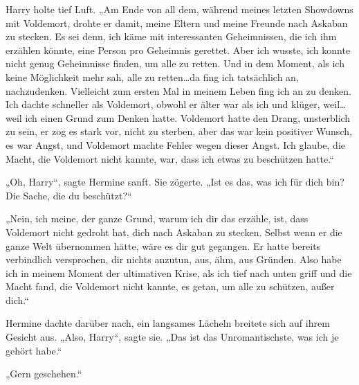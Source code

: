 Harry holte tief Luft.
„Am Ende von all dem, während meines letzten Showdowns mit Voldemort, drohte er damit, meine Eltern und meine Freunde nach Askaban zu stecken. Es sei denn, ich käme mit interessanten Geheimnissen, die ich ihm erzählen könnte, eine Person pro Geheimnis gerettet. Aber ich wusste, ich konnte nicht genug Geheimnisse finden, um alle zu retten. Und in dem Moment, als ich keine Möglichkeit mehr sah, alle zu retten…da fing ich tatsächlich an, nachzudenken. Vielleicht zum ersten Mal in meinem Leben fing ich an zu denken. Ich dachte schneller als Voldemort, obwohl er älter war als ich und klüger, weil…weil ich einen Grund zum Denken hatte. Voldemort hatte den Drang, unsterblich zu sein, er zog es stark vor, nicht zu sterben, aber das war kein positiver Wunsch, es war Angst, und Voldemort machte Fehler wegen dieser Angst. Ich glaube, die Macht, die Voldemort nicht kannte, war, dass ich etwas zu beschützen hatte.“

„Oh, Harry“, sagte Hermine sanft.
Sie zögerte.
„Ist es das, was ich für dich bin? Die Sache, die du beschützt?“

„Nein, ich meine, der ganze Grund, warum ich dir das erzähle, ist, dass Voldemort nicht gedroht hat, dich nach Askaban zu stecken. Selbst wenn er die ganze Welt übernommen hätte, wäre es dir gut gegangen. Er hatte bereits verbindlich versprochen, dir nichts anzutun, aus, ähm, aus Gründen. Also habe ich in meinem Moment der ultimativen Krise, als ich tief nach unten griff und die Macht fand, die Voldemort nicht kannte, es getan, um alle zu schützen, außer dich.“

Hermine dachte darüber nach, ein langsames Lächeln breitete sich auf ihrem Gesicht aus. „Also, Harry“, sagte sie. „Das ist das Unromantischste, was ich je gehört habe.“

„Gern geschehen.“

